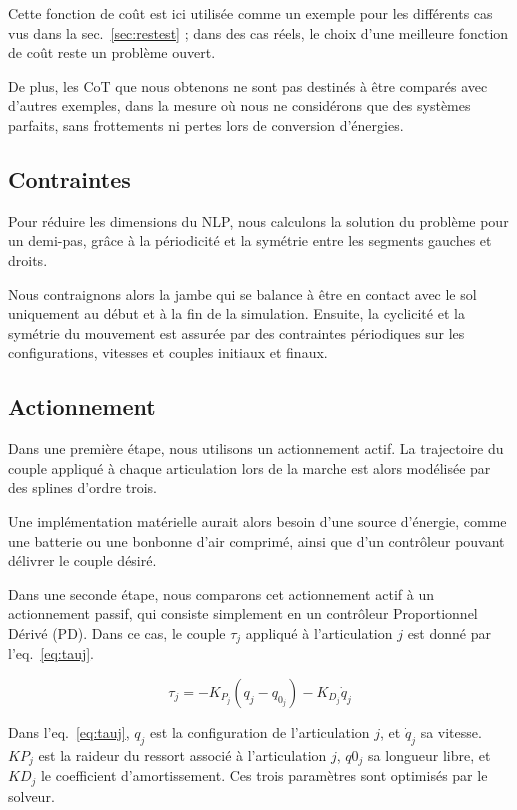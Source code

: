 \documentclass[french,A4paper,]{book}
\begin{document}
Cette fonction de coût est ici utilisée comme un exemple pour les
différents cas vus dans la sec.~\ref{sec:restest} ; dans des cas réels,
le choix d'une meilleure fonction de coût reste un problème ouvert.

De plus, les CoT que nous obtenons ne sont pas destinés à être comparés
avec d'autres exemples, dans la mesure où nous ne considérons que des
systèmes parfaits, sans frottements ni pertes lors de conversion
d'énergies.

\subsection{Contraintes}\label{sec:constraints}

Pour réduire les dimensions du NLP, nous calculons la solution du
problème pour un demi-pas, grâce à la périodicité et la symétrie entre
les segments gauches et droits.

Nous contraignons alors la jambe qui se balance à être en contact avec
le sol uniquement au début et à la fin de la simulation. Ensuite, la
cyclicité et la symétrie du mouvement est assurée par des contraintes
périodiques sur les configurations, vitesses et couples initiaux et
finaux.

\subsection{Actionnement}\label{sec:actuation}

Dans une première étape, nous utilisons un actionnement actif. La
trajectoire du couple appliqué à chaque articulation lors de la marche
est alors modélisée par des splines d'ordre trois.

Une implémentation matérielle aurait alors besoin d'une source
d'énergie, comme une batterie ou une bonbonne d'air comprimé, ainsi que
d'un contrôleur pouvant délivrer le couple désiré.

Dans une seconde étape, nous comparons cet actionnement actif à un
actionnement passif, qui consiste simplement en un contrôleur
Proportionnel Dérivé (PD). Dans ce cas, le couple \(\tau_j\) appliqué à
l'articulation \(j\) est donné par l'eq.~\ref{eq:tauj}.

\begin{equation} \tau_j = - K_{P_j}(q_j - q_{0_j}) - K_{D_j} \dot q_j \label{eq:tauj}\end{equation}

Dans l'eq.~\ref{eq:tauj}, \(q_j\) est la configuration de l'articulation
\(j\), et \(\dot q_j\) sa vitesse. \(KP_j\) est la raideur du ressort
associé à l'articulation \(j\), \(q0_j\) sa longueur libre, et \(KD_j\)
le coefficient d'amortissement. Ces trois paramètres sont optimisés par
le solveur.
\end{document}
